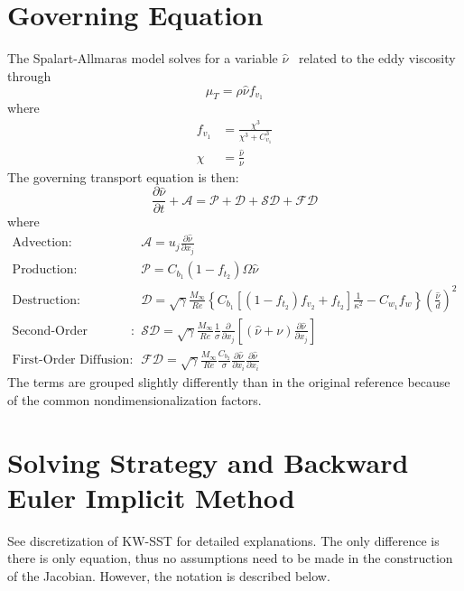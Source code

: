 \documentclass{SelimArticle}
\begin{document}
\maketitle
\newcommand{\sa}{\ensuremath{\hat{\nu}}}
\newcommand{\diff}[2]{\ensuremath{
    \frac{\partial #1}{\partial #2}
}}
\newcommand{\cmu}{\ensuremath{
    \sqrt{\gamma}\frac{M_\infty}{\mathit{Re}}
}}
\section{Governing Equation}
The Spalart-Allmaras model solves for a variable \sa ~ related to the eddy viscosity
through
\begin{equation*}
    \mu_T = \rho\sa f_{v_1}
\end{equation*}
where
\begin{align*}
    f_{v_1} &= \frac{\chi^3}{\chi^3 + C_{v_1}^3}\\
    \chi &= \frac{\sa}{\nu}
\end{align*}
The governing transport equation is then:
\begin{equation*}
    \diff{\sa}{t} + \mathcal{A} = \mathcal{P} + \mathcal{D} + \mathcal{SD} + \mathcal{FD}
\end{equation*}
where
\begin{align*}
    \text{Advection} :\quad &\mathcal{A} = u_j\diff{\sa}{x_j}\\
    \text{Production} :\quad &\mathcal{P} = C_{b_1}(1 - f_{t_2})\Omega\sa\\
    \text{Destruction} :\quad &\mathcal{D} = \cmu\left\{
        C_{b_1}\left[(1 - f_{t_2})f_{v_2} + f_{t_2}\right]\frac{1}{\kappa^2} - C_{w_1}f_w
    \right\} \left(\frac{\sa}{d}\right)^2
    \\
    \text{Second-Order Diffusion} :\quad &\mathcal{SD} = \cmu \frac{1}{\sigma}\diff{}{x_j}\left[
            \left(\sa + \nu\right)\diff{\sa}{x_j}
    \right]
    \\
    \text{First-Order Diffusion} :\quad &\mathcal{FD} = \cmu \frac{C_{b_2}}{\sigma}
        \diff{\sa}{x_i}\diff{\sa}{x_i}
\end{align*}
The terms are grouped slightly differently than in the original reference because of the common
nondimensionalization factors.

\section{Solving Strategy and Backward Euler Implicit Method}
See discretization of KW-SST for detailed explanations.
The only difference is there is only equation, thus no assumptions
need to be made in the construction of the Jacobian.  However, the notation is described below.
\end{document}
